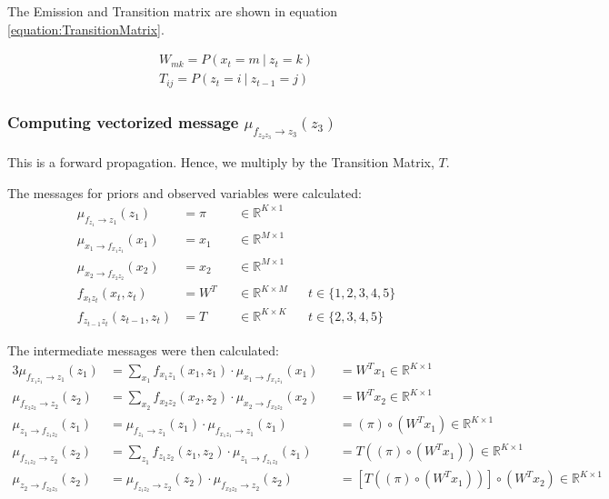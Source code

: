 \documentclass[a4paper,12pt]{article}
\newcommand{\given}{\ | \ }
\newcommand{\msgNtoF}[2]{\mu_{#1 \rightarrow f_{#2}}(#1)}
\newcommand{\msgFtoN}[2]{\mu_{f_{#1} \rightarrow #2}(#2)}
\newcommand{\factorChris}[2]{f_{#1 #2}(#1, #2)}
\begin{document}
The Emission and Transition matrix are shown in equation \ref{equation:TransitionMatrix}. 

\begin{equation}
\label{equation:TransitionMatrix}
\begin{split}
W_{mk} = P(x_{t} = m \given z_{t} = k) \\
T_{ij} = P(z_{t} = i \given z_{t-1} = j)
\end{split}
\end{equation}

\clearpage 

\subsubsection{Computing vectorized message $\msgFtoN{z_2 z_3}{z_3}$}

This is a forward propagation. Hence, we multiply by the Transition Matrix, $T$. 

The messages for priors and observed variables were calculated:
\begin{align}
\msgFtoN{z_{1}}{z_{1}} & = \pi &&\in \mathbb{R}^{K \times 1} \\
\msgNtoF{x_{1}}{x_{1} z_{1}} & = x_{1} &&\in \mathbb{R}^{M \times 1} \\
\msgNtoF{x_{2}}{x_{2} z_{2}} & = x_{2} &&\in \mathbb{R}^{M \times 1} \\
\factorChris{x_{t}}{z_{t}} & = W^{T} &&\in \mathbb{R}^{K \times M} && t \in \{1,2,3,4,5\} \\
\factorChris{z_{t-1}}{z_{t}} & = T &&\in \mathbb{R}^{K \times K} && t \in \{2,3,4,5\}
\end{align}

The intermediate messages were then calculated:
\begin{alignat}{3}
\msgFtoN{x_1 z_1}{z_1} & = \sum_{x_1} \factorChris{x_1}{z_1} \cdot \msgNtoF{x_1}{x_1 z_1} && = W^{T} x_1 \in \mathbb{R}^{K \times 1} \\
\msgFtoN{x_2 z_2}{z_2} & = \sum_{x_2} \factorChris{x_2}{z_2} \cdot \msgNtoF{x_2}{x_2 z_2} && = W^{T} x_2 \in \mathbb{R}^{K \times 1} \\
\msgNtoF{z_1}{z_1 z_2} & = \msgFtoN{z_1}{z_1} \cdot \msgFtoN{x_1 z_1}{z_1} && = (\pi) \circ (W^{T} x_1) \in \mathbb{R}^{K \times 1} \\
\msgFtoN{z_1 z_2}{z_2} & = \sum_{z_1} \factorChris{z_1}{z_2} \cdot \msgNtoF{z_1}{z_1 z_2} && = T \left( (\pi) \circ (W^{T} x_1) \right) \in \mathbb{R}^{K \times 1} \\
\msgNtoF{z_2}{z_2 z_3} & = \msgFtoN{z_1 z_2}{z_2} \cdot \msgFtoN{x_2 z_2}{z_2} && = \left[ T \left( (\pi) \circ (W^{T} x_1) \right) \right] \circ \left( W^{T} x_2 \right) \in \mathbb{R}^{K \times 1}
\end{alignat}
\end{document}
